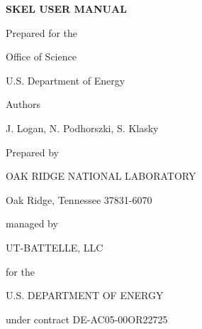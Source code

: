 \begin{center}
{\Large \textbf{SKEL USER MANUAL}}

\vspace{60pt}
Prepared for the

Office of Science

U.S. Department of Energy

\vspace{60pt}
Authors

\vspace{6pt}
J. Logan, N. Podhorszki, S. Klasky




\vspace{72pt}
Prepared by

OAK RIDGE NATIONAL LABORATORY

Oak Ridge, Tennessee 37831-6070

managed by

UT-BATTELLE, LLC

for the

U.S. DEPARTMENT OF ENERGY

under contract DE-AC05-00OR22725

\end{center}


\newpage

\tableofcontents


\newpage

\listoffigures


\newpage



